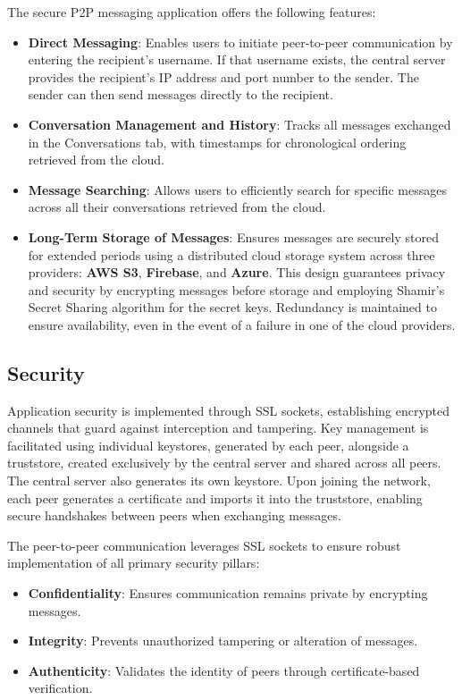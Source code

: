 \documentclass[a4paper,openright,twoside,11pt]{report}
\begin{document}
The secure P2P messaging application offers the following features:
\begin{itemize}
    \item \textbf{Direct Messaging}: Enables users to initiate peer-to-peer communication by entering the recipient's username. If that username exists, the central server provides the recipient's IP address and port number to the sender. The sender can then send messages directly to the recipient.
    \item \textbf{Conversation Management and History}: Tracks all messages exchanged in the Conversations tab, with timestamps for chronological ordering retrieved from the cloud.
    \item \textbf{Message Searching}: Allows users to efficiently search for specific messages across all their conversations retrieved from the cloud.
    \item \textbf{Long-Term Storage of Messages}: Ensures messages are securely stored for extended periods using a distributed cloud storage system across three providers: \textbf{AWS S3}, \textbf{Firebase}, and \textbf{Azure}. This design guarantees privacy and security by encrypting messages before storage and employing Shamir's Secret Sharing algorithm for the secret keys. Redundancy is maintained to ensure availability, even in the event of a failure in one of the cloud providers.
\end{itemize}


\subsection*{{Security}}

Application security is implemented through SSL sockets, establishing encrypted channels that guard against interception and tampering. Key management is facilitated using individual keystores, generated by each peer, alongside a truststore, created exclusively by the central server and shared across all peers. The central server also generates its own keystore. Upon joining the network, each peer generates a certificate and imports it into the truststore, enabling secure handshakes between peers when exchanging messages.
\newline

The peer-to-peer communication leverages SSL sockets to ensure robust implementation of all primary security pillars:
\begin{itemize}
    \item \textbf{Confidentiality}: Ensures communication remains private by encrypting messages.
    \item \textbf{Integrity}: Prevents unauthorized tampering or alteration of messages.
    \item \textbf{Authenticity}: Validates the identity of peers through certificate-based verification.
\end{itemize}
\end{document}
